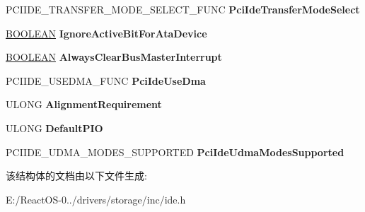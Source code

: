 \begin{DoxyCompactItemize}
\item 
\mbox{\label{struct___i_d_e___c_o_n_t_r_o_l_l_e_r___p_r_o_p_e_r_t_i_e_s_acfe53217aed74fbe0d0f13242f816f92}} 
P\+C\+I\+I\+D\+E\+\_\+\+T\+R\+A\+N\+S\+F\+E\+R\+\_\+\+M\+O\+D\+E\+\_\+\+S\+E\+L\+E\+C\+T\+\_\+\+F\+U\+NC {\bfseries Pci\+Ide\+Transfer\+Mode\+Select}
\item 
\mbox{\label{struct___i_d_e___c_o_n_t_r_o_l_l_e_r___p_r_o_p_e_r_t_i_e_s_ae228505ba85eabe0682495e5f28e564a}} 
\hyperlink{_processor_bind_8h_a112e3146cb38b6ee95e64d85842e380a}{B\+O\+O\+L\+E\+AN} {\bfseries Ignore\+Active\+Bit\+For\+Ata\+Device}
\item 
\mbox{\label{struct___i_d_e___c_o_n_t_r_o_l_l_e_r___p_r_o_p_e_r_t_i_e_s_ab317418524c93d88e4e572d257b24aaa}} 
\hyperlink{_processor_bind_8h_a112e3146cb38b6ee95e64d85842e380a}{B\+O\+O\+L\+E\+AN} {\bfseries Always\+Clear\+Bus\+Master\+Interrupt}
\item 
\mbox{\label{struct___i_d_e___c_o_n_t_r_o_l_l_e_r___p_r_o_p_e_r_t_i_e_s_a03d4501d22b29782b556c4c2cb2d6bc8}} 
P\+C\+I\+I\+D\+E\+\_\+\+U\+S\+E\+D\+M\+A\+\_\+\+F\+U\+NC {\bfseries Pci\+Ide\+Use\+Dma}
\item 
\mbox{\label{struct___i_d_e___c_o_n_t_r_o_l_l_e_r___p_r_o_p_e_r_t_i_e_s_a162f9cd7759dcada808d509ba05f51f7}} 
U\+L\+O\+NG {\bfseries Alignment\+Requirement}
\item 
\mbox{\label{struct___i_d_e___c_o_n_t_r_o_l_l_e_r___p_r_o_p_e_r_t_i_e_s_a7e43645fa0996bb2a98d0c6ed56fadfe}} 
U\+L\+O\+NG {\bfseries Default\+P\+IO}
\item 
\mbox{\label{struct___i_d_e___c_o_n_t_r_o_l_l_e_r___p_r_o_p_e_r_t_i_e_s_ae7fde8115020f15d06fb2c7f7bad6c8f}} 
P\+C\+I\+I\+D\+E\+\_\+\+U\+D\+M\+A\+\_\+\+M\+O\+D\+E\+S\+\_\+\+S\+U\+P\+P\+O\+R\+T\+ED {\bfseries Pci\+Ide\+Udma\+Modes\+Supported}
\end{DoxyCompactItemize}


该结构体的文档由以下文件生成\+:\begin{DoxyCompactItemize}
\item 
E\+:/\+React\+O\+S-\/0../drivers/storage/inc/ide.\+h\end{DoxyCompactItemize}
